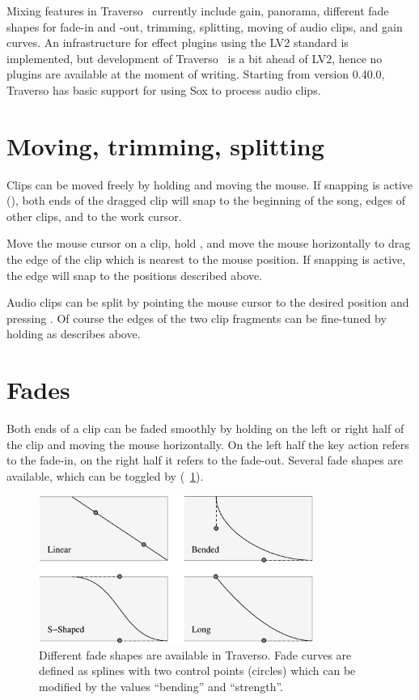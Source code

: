Mixing features in Traverso \Version\ currently include gain, panorama, different fade shapes for fade-in and -out, trimming, splitting, moving of audio clips, and gain curves. An infrastructure for effect plugins using the LV2 standard is implemented, but development of Traverso \Version\ is a bit ahead of LV2, hence no plugins are available at the moment of writing. Starting from version 0.40.0, Traverso has basic support for using Sox to process audio clips.

\section{Moving, trimming, splitting}
Clips can be moved freely by holding  and moving the mouse. If snapping is active (), both ends of the dragged clip will snap to the beginning of the song, edges of other clips, and to the work cursor.

Move the mouse cursor on a clip, hold , and move the mouse horizontally to drag the edge of the clip which is nearest to the mouse position. If snapping is active, the edge will snap to the positions described above.

Audio clips can be split by pointing the mouse cursor to the desired position and pressing . Of course the edges of the two clip fragments can be fine-tuned by holding  as describes above.

\section{Fades}
Both ends of a clip can be faded smoothly by holding  on the left or right half of the clip and moving the mouse horizontally. On the left half the key action refers to the fade-in, on the right half it refers to the fade-out. Several fade shapes are available, which can be toggled by  (\FigB~\ref{fig_fades01}).

\begin{figure}[t]
 \centering\includegraphics[width=0.8\textwidth]{images/fades}
 \caption{Different fade shapes are available in Traverso. Fade curves are defined as splines with two control points (circles) which can be modified by the values ``bending'' and ``strength''.}
 \label{fig_fades01}
\end{figure}

